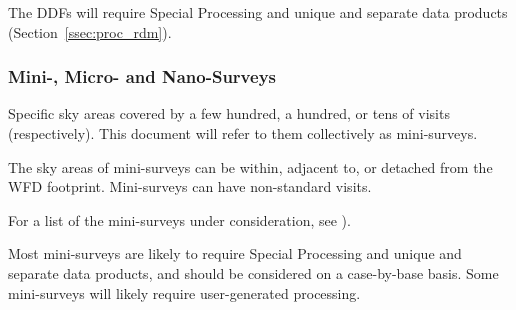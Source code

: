 The DDFs will require Special Processing and unique and separate data products (Section~\ref{ssec:proc_rdm}).

\subsubsection{Mini-, Micro- and Nano-Surveys}

Specific sky areas covered by a few hundred, a hundred, or tens of visits (respectively).
This document will refer to them collectively as mini-surveys.

The sky areas of mini-surveys can be within, adjacent to, or detached from the WFD footprint.
Mini-surveys can have non-standard visits.

For a list of the mini-surveys under consideration,
see ).

Most mini-surveys are likely to require Special Processing and unique and separate data products,
and should be considered on a case-by-base basis.
Some mini-surveys will likely require user-generated processing.
